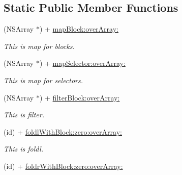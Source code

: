 \subsection*{Static Public Member Functions}
\begin{DoxyCompactItemize}
\item 
\hypertarget{interface_n_s_array_07_generics_08_a1cf9fa6eb6ece42cc5b35f5677160006}{(N\-S\-Array $\ast$) + \hyperlink{interface_n_s_array_07_generics_08_a1cf9fa6eb6ece42cc5b35f5677160006}{map\-Block\-:over\-Array\-:}}\label{interface_n_s_array_07_generics_08_a1cf9fa6eb6ece42cc5b35f5677160006}

\begin{DoxyCompactList}\small\item\em This is map for blocks. \end{DoxyCompactList}\item 
\hypertarget{interface_n_s_array_07_generics_08_a2a092ae62e8c12bcb05e0a96c87a389e}{(N\-S\-Array $\ast$) + \hyperlink{interface_n_s_array_07_generics_08_a2a092ae62e8c12bcb05e0a96c87a389e}{map\-Selector\-:over\-Array\-:}}\label{interface_n_s_array_07_generics_08_a2a092ae62e8c12bcb05e0a96c87a389e}

\begin{DoxyCompactList}\small\item\em This is map for selectors. \end{DoxyCompactList}\item 
\hypertarget{interface_n_s_array_07_generics_08_abec96fd2375b7d840d1beed7e2776373}{(N\-S\-Array $\ast$) + \hyperlink{interface_n_s_array_07_generics_08_abec96fd2375b7d840d1beed7e2776373}{filter\-Block\-:over\-Array\-:}}\label{interface_n_s_array_07_generics_08_abec96fd2375b7d840d1beed7e2776373}

\begin{DoxyCompactList}\small\item\em This is filter. \end{DoxyCompactList}\item 
\hypertarget{interface_n_s_array_07_generics_08_a6c8e13ca7ffd07b3b9d0f96c0bc262ab}{(id) + \hyperlink{interface_n_s_array_07_generics_08_a6c8e13ca7ffd07b3b9d0f96c0bc262ab}{foldl\-With\-Block\-:zero\-:over\-Array\-:}}\label{interface_n_s_array_07_generics_08_a6c8e13ca7ffd07b3b9d0f96c0bc262ab}

\begin{DoxyCompactList}\small\item\em This is foldl. \end{DoxyCompactList}\item 
\hypertarget{interface_n_s_array_07_generics_08_ad4d35370b078e971e5c3014d62c73048}{(id) + \hyperlink{interface_n_s_array_07_generics_08_ad4d35370b078e971e5c3014d62c73048}{foldr\-With\-Block\-:zero\-:over\-Array\-:}}\label{interface_n_s_array_07_generics_08_ad4d35370b078e971e5c3014d62c73048}


\end{DoxyCompactItemize}
